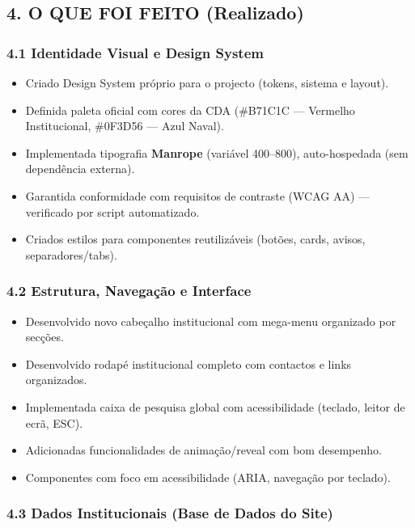 \subsection{4. O QUE FOI FEITO
(Realizado)}\label{o-que-foi-feito-realizado}

\subsubsection{4.1 Identidade Visual e Design
System}\label{identidade-visual-e-design-system}

\begin{itemize}
\tightlist
\item
  Criado Design System próprio para o projecto (tokens, sistema e
  layout).
\item
  Definida paleta oficial com cores da CDA (\#B71C1C --- Vermelho
  Institucional, \#0F3D56 --- Azul Naval).
\item
  Implementada tipografia \textbf{Manrope} (variável 400--800),
  auto-hospedada (sem dependência externa).
\item
  Garantida conformidade com requisitos de contraste (WCAG AA) ---
  verificado por script automatizado.
\item
  Criados estilos para componentes reutilizáveis (botões, cards, avisos,
  separadores/tabs).
\end{itemize}

\subsubsection{4.2 Estrutura, Navegação e
Interface}\label{estrutura-navegauxe7uxe3o-e-interface}

\begin{itemize}
\tightlist
\item
  Desenvolvido novo cabeçalho institucional com mega-menu organizado por
  secções.
\item
  Desenvolvido rodapé institucional completo com contactos e links
  organizados.
\item
  Implementada caixa de pesquisa global com acessibilidade (teclado,
  leitor de ecrã, ESC).
\item
  Adicionadas funcionalidades de animação/reveal com bom desempenho.
\item
  Componentes com foco em acessibilidade (ARIA, navegação por teclado).
\end{itemize}

\subsubsection{4.3 Dados Institucionais (Base de Dados do
Site)}\label{dados-institucionais-base-de-dados-do-site}

